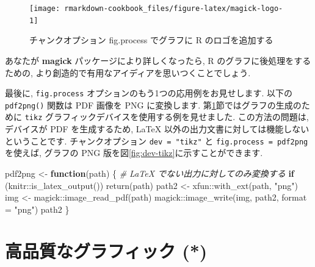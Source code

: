 \documentclass[
  11pt,
  lualatex,ja=standard,jafont=noto]{bxjsreport}
\newenvironment{Shaded}{\begin{snugshade}}{\end{snugshade}}
\newcommand{\AttributeTok}[1]{\textcolor[rgb]{0.77,0.63,0.00}{#1}}
\newcommand{\CommentTok}[1]{\textcolor[rgb]{0.56,0.35,0.01}{\textit{#1}}}
\newcommand{\ControlFlowTok}[1]{\textcolor[rgb]{0.13,0.29,0.53}{\textbf{#1}}}
\newcommand{\FunctionTok}[1]{\textcolor[rgb]{0.00,0.00,0.00}{#1}}
\newcommand{\NormalTok}[1]{#1}
\newcommand{\OtherTok}[1]{\textcolor[rgb]{0.56,0.35,0.01}{#1}}
\newcommand{\SpecialCharTok}[1]{\textcolor[rgb]{0.00,0.00,0.00}{#1}}
\newcommand{\StringTok}[1]{\textcolor[rgb]{0.31,0.60,0.02}{#1}}
\begin{document}
\begin{figure}

{\centering \texttt{[image: rmarkdown-cookbook\_files/figure-latex/magick-logo-1]} 

}

\caption{チャンクオプション fig.process でグラフに R のロゴを追加する}\label{fig:magick-logo}
\end{figure}

あなたが \textbf{magick} パッケージにより詳しくなったら, R のグラフに後処理をするための, より創造的で有用なアイディアを思いつくことでしょう.

最後に, \texttt{fig.process} オプションのもう1つの応用例をお見せします. 以下の \texttt{pdf2png()} 関数は PDF 画像を PNG に変換します. 第\ref{graphical-device}節ではグラフの生成のために \texttt{tikz} グラフィックデバイスを使用する例を見せました. この方法の問題は, デバイスが PDF を生成するため, LaTeX 以外の出力文書に対しては機能しないということです. チャンクオプション \texttt{dev = "tikz"} と \texttt{fig.process = pdf2png} を使えば, グラフの PNG 版を図\ref{fig:dev-tikz}に示すことができます.

\begin{Shaded}
\begin{Highlighting}[numbers=left,,]
\NormalTok{pdf2png }\OtherTok{\textless{}{-}} \ControlFlowTok{function}\NormalTok{(path) \{}
  \CommentTok{\# LaTeX でない出力に対してのみ変換する}
  \ControlFlowTok{if}\NormalTok{ (knitr}\SpecialCharTok{::}\FunctionTok{is\_latex\_output}\NormalTok{()) }
    \FunctionTok{return}\NormalTok{(path)}
\NormalTok{  path2 }\OtherTok{\textless{}{-}}\NormalTok{ xfun}\SpecialCharTok{::}\FunctionTok{with\_ext}\NormalTok{(path, }\StringTok{"png"}\NormalTok{)}
\NormalTok{  img }\OtherTok{\textless{}{-}}\NormalTok{ magick}\SpecialCharTok{::}\FunctionTok{image\_read\_pdf}\NormalTok{(path)}
\NormalTok{  magick}\SpecialCharTok{::}\FunctionTok{image\_write}\NormalTok{(img, path2, }\AttributeTok{format =} \StringTok{"png"}\NormalTok{)}
\NormalTok{  path2}
\NormalTok{\}}
\end{Highlighting}
\end{Shaded}

\hypertarget{graphical-device}{%
\section{高品質なグラフィック (*)}\label{graphical-device}}
\end{document}
